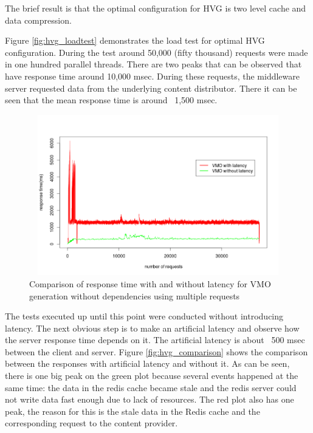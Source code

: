 The brief result is that the optimal configuration for HVG is two level cache and data compression.


Figure \ref{fig:hvg_loadtest} demonstrates the load test for optimal HVG configuration. During the test around 50,000 (fifty thousand) requests were made in one hundred parallel threads. There are two peaks that can be observed that have response time around 10,000 msec. During these requests, the middleware server requested data from the underlying content distributor. There it can be seen that the mean response time is around ~1,500 msec.


\begin{figure}[h!]
    \centering
    \includegraphics[width=15cm,height=7cm,keepaspectratio]{images/vmo_parallel_comparison.png}
    \caption{Comparison of response time with and without latency for VMO generation without dependencies using multiple requests}
    \label{fig:vmo_comparison}
\end{figure}

The tests executed up until this point were conducted without introducing latency. The next obvious step is to make an artificial latency and observe how the server response time depends on it. The artificial latency is about ~500 msec between the client and server. Figure \ref{fig:hvg_comparison} shows the comparison between the responses with artificial latency and without it. As can be seen, there is one big peak on the green plot because several events happened at the same time: the data in the redis cache became stale and the redis server could not write data fast enough due to lack of resources. The red plot also has one peak, the reason for this is the stale data in the Redis cache and the corresponding request to the content provider.

